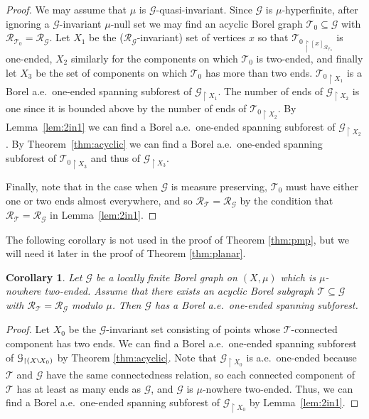 \documentclass[11pt]{amsart}
\theoremstyle{definition}
\theoremstyle{plain}
\newtheorem{corollary}[definition]{Corollary}
\newcommand{\<}{\langle}
\renewcommand{\>}{\rangle}
\newcommand{\Ggraph}{\mathcal{G}}
\newcommand{\Tgraph}{\mathcal{T}}
\newcommand\RR{\mathscr{R}}
\newcommand{\mysetminusD}{\hbox{\tikz{\draw[line width=0.6pt,line cap=round] (3pt,0) -- (0,6pt);}}}
\newcommand{\mysetminusT}{\mysetminusD}
\newcommand{\mysetminusS}{\hbox{\tikz{\draw[line width=0.45pt,line cap=round] (2pt,0) -- (0,4pt);}}}
\newcommand{\mysetminusSS}{\hbox{\tikz{\draw[line width=0.4pt,line cap=round] (1.5pt,0) -- (0,3pt);}}}
\newcommand{\mysetminus}{\mathbin{\mathchoice{\mysetminusD}{\mysetminusT}{\mysetminusS}{\mysetminusSS}}}%
\begin{document}
\begin{proof}
We may assume that $\mu$ is $\Ggraph$-quasi-invariant.
Since $\Ggraph$ is $\mu$-hyperfinite, after ignoring a
$\Ggraph$-invariant $\mu$-null set we may find an acyclic Borel graph
$\Tgraph_0\subseteq \Ggraph$ with $\RR_{\Tgraph_0} =
\RR_{\Ggraph}$. Let $X_1$ be the ($\RR_{\Ggraph}$-invariant) set of vertices $x$ so that
${\Tgraph_{0} }_{\restriction
[x]_{\RR_{\Tgraph_0}}}$ is one-ended, $X_2$ similarly for the
components on which $\Tgraph_{0}$ is two-ended, and finally let $X_3$ be the
set of components on which $\Tgraph_{0}$ has more than two ends.
${\Tgraph_0}_{\restriction  X_1}$ is a Borel a.e.\ one-ended spanning subforest of $\Ggraph _{\restriction
X_1}$.
The number of ends of $\Ggraph _{\restriction  X_2}$ is one since it is bounded above by the number of ends of ${\Tgraph_{0}} _{\restriction  X_2}$.
By Lemma~\ref{lem:2in1} we can find a Borel a.e.\ one-ended spanning
subforest of $\Ggraph _{\restriction  X_2}$. By Theorem~\ref{thm:acyclic} we can find
a Borel a.e.\ one-ended spanning subforest of  ${\Tgraph_{0}} _{\restriction  X_3}$ and thus of $\Ggraph _{\restriction  X_3}$.

Finally, note that in the case when $\Ggraph$ is measure
preserving, $\Tgraph_0$ must have either one or two ends almost
everywhere, and so $\RR_{\Tgraph} = \RR_{\Ggraph}$ by the
condition that $\RR_\Tgraph = \RR_\Ggraph$ in Lemma~\ref{lem:2in1}.
\end{proof}

The following corollary is not used in the proof of Theorem \ref{thm:pmp}, but we will need it later in the proof of Theorem \ref{thm:planar}.

\begin{corollary}\label{cor:subtree}
Let ${\Ggraph}$ be a locally finite Borel graph on $(X,\mu )$ which is
$\mu$-nowhere two-ended. Assume that there exists an acyclic Borel subgraph ${\Tgraph}\subseteq {\Ggraph}$ with $\RR_{\Tgraph}=\RR_{\Ggraph}$ modulo $\mu$. Then ${\Ggraph}$ has a Borel a.e.\ one-ended spanning subforest.
\end{corollary}

\begin{proof}
Let $X_0$ be the ${\Ggraph}$-invariant set consisting of points whose
${\Tgraph}$-connected component has two ends. We can find a Borel a.e.\
one-ended spanning subforest of $\Ggraph _{\restriction  (X \mysetminus X_0)}$ by Theorem
\ref{thm:acyclic}.
Note that
${\Ggraph}_{\restriction X_0}$ is a.e.\ one-ended because
$\Tgraph$ and $\Ggraph$ have the same connectedness relation, so each
connected component of $\Tgraph$ has at least as many ends as $\Ggraph$,
and $\Ggraph$ is $\mu$-nowhere two-ended. Thus, we can find a Borel a.e.\
one-ended spanning subforest of $\Ggraph _{\restriction  X_0}$ by Lemma~\ref{lem:2in1}.
\end{proof}
\end{document}
